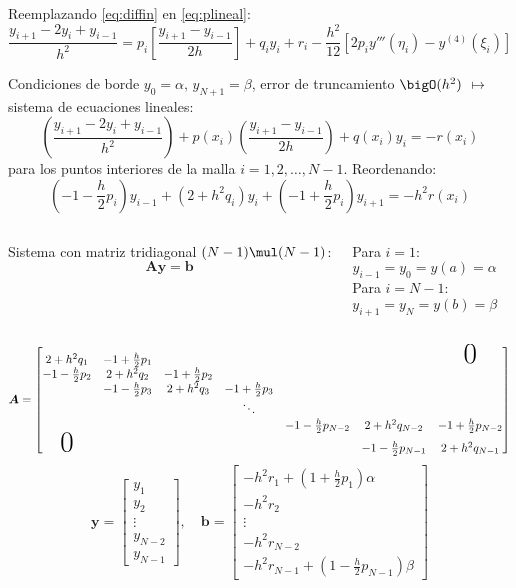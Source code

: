 \documentclass[9pt, aspectratio=169]{beamer}
\begin{document}
\begin{frame}
Reemplazando \eqref{eq:diffin} en \eqref{eq:plineal}:
\[
\frac{y_{i+1} - 2 y_i + y_{i-1}}{h^2} = p_{i} \left[\frac{y_{i+1} - y_{i-1}}{2h}\right] + q_i y_i + r_i - \frac{h^2}{12}[2 p_i y'''(\eta_i) - y^{(4)}(\xi_i)] \]
\pause

Condiciones de borde $y_0 = \alpha, \, y_{N + 1} = \beta$, error de truncamiento $\bigO(h^2)$ $\mapsto$ sistema de ecuaciones lineales:
\[ \left(\frac{y_{i+1} - 2 y_i + y_{i-1}}{h^2}\right) + p(x_i) \left(\frac{y_{i+1} - y_{i-1}}{2 h}\right) + q(x_i) y_i = -r(x_i) \]
para los puntos interiores de la malla $i = 1, 2, \ldots, N - 1$. Reordenando:
\[\left(-1 - \frac{h}{2}p_i\right) y_{i-1} + \left(2 + h^2 q_i \right) y_i + \left(-1 + \frac{h}{2} p_i \right) y_{i+1} = -h^2 r(x_i) \]
\begin{columns}[t]
\cx
Sistema con matriz tridiagonal $(N - 1) \mul (N - 1)$:
\[ \bm{A} \bm{y} = \bm{b} \]

\cx
Para $i = 1$: 
\[ y_{i-1} = y_0 = y(a) = \alpha \]
Para $i = N-1$:
\[ y_{i + 1} = y_N = y(b) = \beta \]
\end{columns}
\end{frame}

\begin{frame}
    \[ \bm{A} = \begin{bmatrix}
        2 + h^2 q_1 & -1 + \frac{h}{2} p_1 & & & & & \text{\Huge 0} \\
        -1-\frac{h}{2} p_2 & 2 + h^2 q_2 & -1 +\frac{h}{2} p_2 & & & \\
                              & -1-\frac{h}{2} p_3 & 2 + h^2 q_3 & -1 +\frac{h}{2} p_3  & & \\
                              & & & \ddots &  & & \\
                              & & && -1-\frac{h}{2} p_{N-2} & 2 + h^2 q_{N-2} & -1 +\frac{h}{2} p_{N-2} \\
        \text{\Huge 0}              & & & & & -1 - \frac{h}{2} p_{N-1} & 2 + h^2 q_{N-1}
    \end{bmatrix} \]
    \[ \bm{y} = \begin{bmatrix} y_1 \\ y_2 \\ \vdots \\ y_{N-2} \\ y_{N-1} \end{bmatrix}, \quad 
    \bm{b} = \begin{bmatrix} 
        -h^2 r_1 + \left(1 + \frac{h}{2} p_1 \right) \alpha \\
        -h^2 r_2 \\
        \vdots \\
    -h^2 r_{N-2} \\
    -h^2 r_{N-1} + \left(1 - \frac{h}{2} p_{N-1} \right) \beta
\end{bmatrix} 
    \]
\end{frame}
\end{document}

